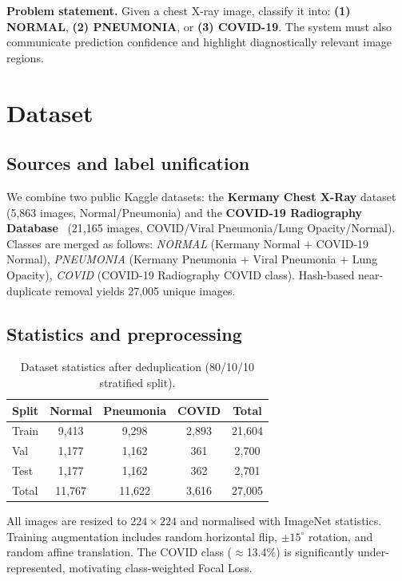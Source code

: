 \documentclass{article}
\begin{document}
\textbf{Problem statement.}
Given a chest X-ray image, classify it into:
\textbf{(1) NORMAL}, \textbf{(2) PNEUMONIA}, or \textbf{(3) COVID-19}.
The system must also communicate prediction confidence and highlight diagnostically
relevant image regions.

\section{Dataset}
\label{sec:data}

\subsection{Sources and label unification}

We combine two public Kaggle datasets: the \textbf{Kermany Chest X-Ray}
dataset~\cite{kermany2018} (5{,}863 images, Normal/Pneumonia) and the
\textbf{COVID-19 Radiography Database}~\cite{chowdhury2020} (21{,}165 images,
COVID/Viral Pneumonia/Lung Opacity/Normal). Classes are merged as follows:
\textit{NORMAL} (Kermany Normal + COVID-19 Normal),
\textit{PNEUMONIA} (Kermany Pneumonia + Viral Pneumonia + Lung Opacity),
\textit{COVID} (COVID-19 Radiography COVID class).
Hash-based near-duplicate removal yields 27{,}005 unique images.

\subsection{Statistics and preprocessing}

\begin{table}[h]
\centering
\caption{Dataset statistics after deduplication (80/10/10 stratified split).}
\label{tab:dataset}
\small
\begin{tabular}{lcccc}
\toprule
\textbf{Split} & \textbf{Normal} & \textbf{Pneumonia} & \textbf{COVID} & \textbf{Total}\\
\midrule
Train & 9{,}413 & 9{,}298 & 2{,}893 & 21{,}604\\
Val   & 1{,}177 & 1{,}162 &    361  &  2{,}700\\
Test  & 1{,}177 & 1{,}162 &    362  &  2{,}701\\
\midrule
Total & 11{,}767 & 11{,}622 & 3{,}616 & 27{,}005\\
\bottomrule
\end{tabular}
\end{table}

All images are resized to $224\times224$ and normalised with ImageNet statistics.
Training augmentation includes random horizontal flip, $\pm15^\circ$ rotation, and
random affine translation. The COVID class ($\approx$13.4\%) is significantly
under-represented, motivating class-weighted Focal Loss.
\end{document}
